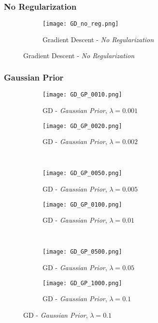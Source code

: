 \documentclass{report}
\begin{document}
			\subsubsection*{No Regularization}
			\begin{figure}[H] \renewcommand\thesubfigure{GD.NR}
				\centering
				\begin{subfigure}[b]{0.7\textwidth}
					\texttt{[image: GD\_no\_reg.png]}
					\caption{Gradient Descent - \textit{No Regularization}}
					\label{fig:GD_NR}
				\end{subfigure}
			\end{figure}
			\subsubsection*{Gaussian Prior}
			\begin{figure}[H] \renewcommand\thesubfigure{GD.GP.\arabic{subfigure}}
				\centering
				\begin{subfigure}[b]{0.45\textwidth}
					\texttt{[image: GD\_GP\_0010.png]}
					\caption{GD - \textit{Gaussian Prior}, $\lambda = 0.001$}
					\label{fig:GD_GP001}
				\end{subfigure}
				\begin{subfigure}[b]{0.45\textwidth}
					\texttt{[image: GD\_GP\_0020.png]}
					\caption{GD - \textit{Gaussian Prior}, $\lambda = 0.002$}
					\label{fig:GD_GP002}
				\end{subfigure}
				\\
				\centering
				\begin{subfigure}[b]{0.45\textwidth}
					\texttt{[image: GD\_GP\_0050.png]}
					\caption{GD - \textit{Gaussian Prior}, $\lambda = 0.005$}
					\label{fig:GD_GP005}
				\end{subfigure}
				\begin{subfigure}[b]{0.45\textwidth}
					\texttt{[image: GD\_GP\_0100.png]}
					\caption{GD - \textit{Gaussian Prior}, $\lambda = 0.01$}
					\label{fig:GD_GP01}
				\end{subfigure}
				\\
				\centering
				\begin{subfigure}[b]{0.45\textwidth}
					\texttt{[image: GD\_GP\_0500.png]}
					\caption{GD - \textit{Gaussian Prior}, $\lambda = 0.05$}
					\label{fig:GD_GP05}
				\end{subfigure}
				\begin{subfigure}[b]{0.45\textwidth}
					\texttt{[image: GD\_GP\_1000.png]}
					\caption{GD - \textit{Gaussian Prior}, $\lambda = 0.1$}
					\label{fig:GD_GP1}
				\end{subfigure}
			\end{figure}
\end{document}
